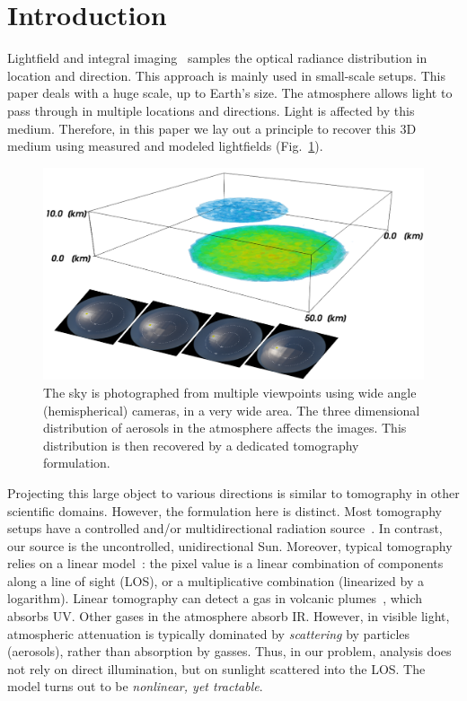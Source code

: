 \documentclass[10pt,twocolumn,letterpaper]{article}
\newcommand{\yoavcomment}[1]{}
\renewcommand{\yoavcomment}[1]{#1} %
\begin{document}
\section{Introduction}

Lightfield and integral imaging~\cite{bishop,horstmeyer,kim,levoy}  samples the optical radiance distribution in location and direction. This approach is mainly used in small-scale setups. This paper deals with a huge scale, up to Earth's size.
The atmosphere allows light to pass through in multiple locations and directions. Light is affected by this medium. Therefore, in this paper we lay out a principle to recover this 3D medium using measured and modeled lightfields (Fig.~\ref{fig:front}).
\begin{figure}[t!]
  \centering
  \yoavcomment{\includegraphics[width=\columnwidth]{images/front_img.pdf}}
    \caption{\small The sky is photographed from multiple viewpoints using wide angle (hemispherical) cameras, in a very wide area. The three dimensional distribution of aerosols in the atmosphere affects the images. This distribution is then recovered by a dedicated tomography formulation.}
  \label{fig:front}
\end{figure}

Projecting this large object to various directions is similar to tomography in other scientific domains. However, the formulation here is distinct. Most tomography setups have a controlled and/or multidirectional radiation source~\cite{gorbunov,messer}. In contrast, our source is the uncontrolled, unidirectional Sun. Moreover, typical tomography relies on a linear model~\cite{gregson}: the pixel value is a linear combination of components along a line of sight (LOS), or a multiplicative combination (linearized by a logarithm). Linear tomography can detect a gas in volcanic plumes~\cite{wright}, which absorbs UV. Other gases in the atmosphere absorb IR. However, in visible light, atmospheric attenuation is typically dominated by {\em scattering} by particles (aerosols), rather than absorption by gasses. Thus, %
in our problem, analysis does not rely on direct illumination, but on sunlight scattered into the LOS. The model turns out to be {\em nonlinear, yet tractable}.
\end{document}
